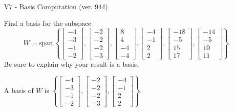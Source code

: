 \begin{exercise}
  \begin{exerciseTitle}V7 - Basis Computation (ver. 944)\end{exerciseTitle}
  \begin{exerciseStatement}
    Find a basis for the subspace 
\[W=\mathrm{span}\ \left\{\left[\begin{array}{r}
-4 \\
-3 \\
-1 \\
-2
\end{array}\right] , \left[\begin{array}{r}
-2 \\
-2 \\
-2 \\
-3
\end{array}\right] , \left[\begin{array}{r}
8 \\
4 \\
-4 \\
-4
\end{array}\right] , \left[\begin{array}{r}
-4 \\
-1 \\
2 \\
2
\end{array}\right] , \left[\begin{array}{r}
-18 \\
-5 \\
15 \\
17
\end{array}\right] , \left[\begin{array}{r}
-14 \\
-5 \\
10 \\
11
\end{array}\right]\right\}.\]
 Be sure to explain why your result is a basis.


  \end{exerciseStatement}
  \begin{exerciseAnswer}
   A basis of \(W\) is  \(\left\{\left[\begin{array}{r}
-4 \\
-3 \\
-1 \\
-2
\end{array}\right] , \left[\begin{array}{r}
-2 \\
-2 \\
-2 \\
-3
\end{array}\right] , \left[\begin{array}{r}
-4 \\
-1 \\
2 \\
2
\end{array}\right]\right\}\).
  


  \end{exerciseAnswer}
\end{exercise}